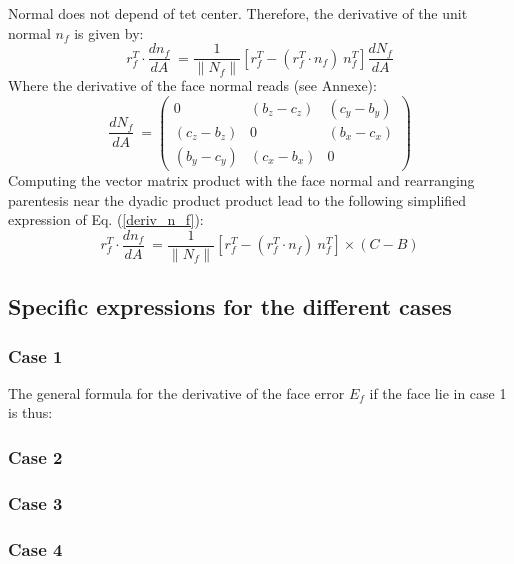 \documentclass[11pt]{article}
\begin{document}
Normal does not depend of tet center. Therefore, the derivative of the unit normal $n_f$ is given by:
\begin{equation}
r_f^T\cdot \frac{d n_f}{dA}\ = 
 \frac{1}{\| N_f \|} \left[ r_f^T -  (r_f^T \cdot n_f)\ n_f^T \right] \frac{d N_f}{dA}
 \label{deriv_n_f}
\end{equation}
Where the derivative of the face normal reads (see Annexe):
\begin{equation}
\frac{d N_f}{dA}\ = \begin{pmatrix}
0 & (b_z-c_z) & (c_y-b_y) \\
(c_z-b_z) & 0 & (b_x-c_x) \\
(b_y-c_y) & (c_x-b_x) & 0
\end{pmatrix} 
\end{equation}
Computing the vector matrix product with the face normal and rearranging parentesis near the dyadic product product lead to the following simplified expression of Eq. (\ref{deriv_n_f}):
\begin{equation}
r_f^T\cdot \frac{d n_f}{dA}\ = 
 \frac{1}{\| N_f \|} \left[ r_f^T -  (r_f^T \cdot n_f)\ n_f^T \right] \times (C-B)
\end{equation}


\subsection{Specific expressions for the different cases}

\subsubsection{Case 1}

The general formula for the derivative of the face error $E_f$ if the face lie in case 1 is thus:


\subsubsection{Case 2}


\subsubsection{Case 3}

\subsubsection{Case 4}
\end{document}
